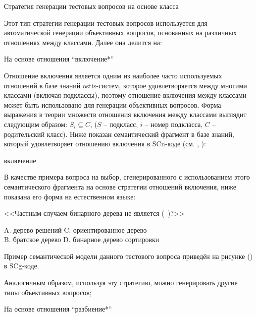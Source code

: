 \begin{textitemize}
	\item Стратегия генерации тестовых вопросов на основе класса
	
	Этот тип стратегии генерации тестовых вопросов используется для автоматической генерации объективных вопросов, основанных на различных отношениях между классами. Далее она делится на:
	
	\begin{textitemize}
		\item На основе отношения ``включение*''
		
		Отношение включения является одним из наиболее часто используемых отношений в базе знаний ostis-систем, которое удовлетворяется между многими классами (включая подклассы), поэтому отношение включения между классами может быть использовано для генерации объективных вопросов. Форма выражения в теории множеств отношения включения между классами выглядит следующим образом: $S_{i}\subseteq  C $, ($S$ – подкласс, $i$ – номер подкласса, $C$ – родительский класс). Ниже показан семантический фрагмент в базе знаний, который удовлетворяет отношению включения в SCn-коде (см. , ): 
		\begin{SCn}
			\begin{scnrelfromlist}{включение} 
			\end{scnrelfromlist}
		\end{SCn}
		В качестве примера вопроса на выбор, сгенерированного с использованием этого семантического фрагмента на основе стратегии отношений включения, ниже показана его форма на естественном языке:
		
		<<Частным случаем бинарного дерева не является (\ )?>>
		
		A. дерево решений   \quad C. ориентированное дерево \\
		B. братское дерево  \quad D. бинарное дерево сортировки
		
		Пример семантической модели данного тестового вопроса приведён на рисунке (\textit{}) в SCg-коде.
		
		Аналогичным образом, используя эту стратегию, можно генерировать другие типы объективных вопросов;
		
		\item На основе отношения ``разбиение*''
		

\end{textitemize}
\end{textitemize}
